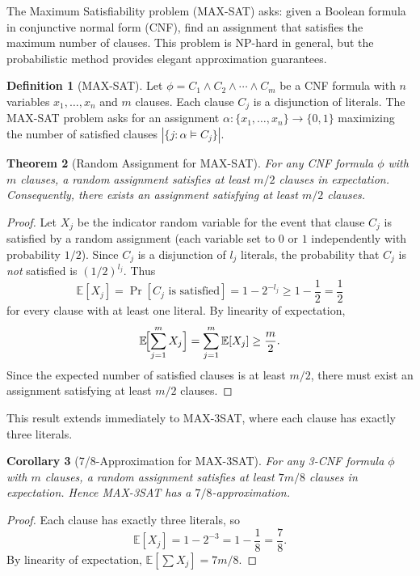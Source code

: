 \documentclass[twoside,12pt]{book}
\theoremstyle{plain}
\newtheorem{theorem}{Theorem}[chapter]
\newtheorem{corollary}[theorem]{Corollary}
\theoremstyle{definition}
\newtheorem{definition}[theorem]{Definition}
\theoremstyle{remark}
\begin{document}
The Maximum Satisfiability problem (MAX-SAT) asks: given a Boolean
formula in conjunctive normal form (CNF), find an assignment that
satisfies the maximum number of clauses. This problem is NP-hard in
general, but the probabilistic method provides elegant approximation
guarantees.

\begin{definition}[MAX-SAT]
Let $\phi = C_1 \wedge C_2 \wedge \cdots \wedge C_m$ be a CNF formula
with $n$ variables $x_1, \ldots, x_n$ and $m$ clauses. Each clause $C_j$
is a disjunction of literals. The MAX-SAT problem asks for an assignment
$\alpha : \{x_1, \ldots, x_n\} \to \{0, 1\}$ maximizing the number of
satisfied clauses $|\{j : \alpha \models C_j\}|$.
\end{definition}

\begin{theorem}[Random Assignment for MAX-SAT]
\label{thm:maxsat-random}
For any CNF formula $\phi$ with $m$ clauses, a random assignment satisfies
at least $m/2$ clauses in expectation. Consequently, there exists an
assignment satisfying at least $m/2$ clauses.
\end{theorem}

\begin{proof}
Let $X_j$ be the indicator random variable for the event that clause $C_j$
is satisfied by a random assignment (each variable set to $0$ or $1$
independently with probability $1/2$). Since $C_j$ is a disjunction of
$l_j$ literals, the probability that $C_j$ is \emph{not} satisfied is
$(1/2)^{l_j}$. Thus
\[
\mathbb{E}[X_j] = \Pr[C_j \text{ is satisfied}] = 1 - 2^{-l_j} \geq 1 - \frac{1}{2} = \frac{1}{2}
\]
for every clause with at least one literal. By linearity of expectation,
\[
\mathbb{E}\!\Bigl[\sum_{j=1}^{m} X_j\Bigr] = \sum_{j=1}^{m} \mathbb{E}[X_j]
\geq \frac{m}{2}.
\]
Since the expected number of satisfied clauses is at least $m/2$, there
must exist an assignment satisfying at least $m/2$ clauses.
\end{proof}

This result extends immediately to MAX-3SAT, where each clause has exactly
three literals.

\begin{corollary}[7/8-Approximation for MAX-3SAT]
\label{cor:max3sat}
For any 3-CNF formula $\phi$ with $m$ clauses, a random assignment satisfies
at least $7m/8$ clauses in expectation. Hence MAX-3SAT has a
$7/8$-approximation.
\end{corollary}

\begin{proof}
Each clause has exactly three literals, so
\[
\mathbb{E}[X_j] = 1 - 2^{-3} = 1 - \frac{1}{8} = \frac{7}{8}.
\]
By linearity of expectation, $\mathbb{E}[\sum X_j] = 7m/8$.
\end{proof}
\end{document}
